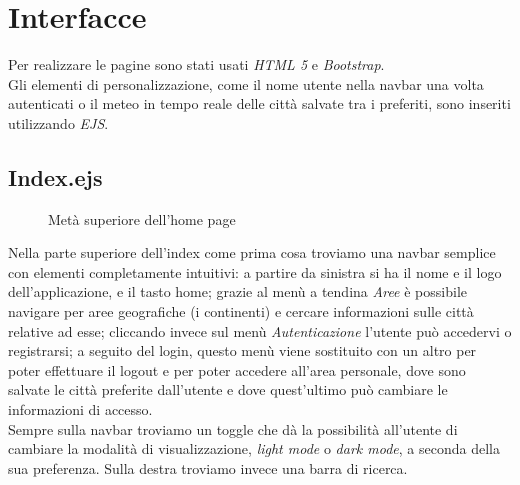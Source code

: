 \chapter{Interfacce}

Per realizzare le pagine sono stati usati \emph{HTML 5} e \emph{Bootstrap}.\\
Gli elementi di personalizzazione, come il nome utente nella navbar una volta autenticati o il meteo
in tempo reale delle città salvate tra i preferiti, sono inseriti utilizzando \emph{EJS}.

\section{Index.ejs}

\begin{figure}[ht]
    \centering
    \caption{Metà superiore dell'home page}
\end{figure}

Nella parte superiore dell'index come prima cosa troviamo una navbar semplice con elementi completamente intuitivi: a partire da sinistra si ha il nome e il logo dell'applicazione,
e il tasto home; grazie al menù a tendina \emph{Aree} è possibile navigare per aree geografiche (i continenti) e cercare informazioni sulle città relative ad esse; cliccando invece sul menù \emph{Autenticazione}
l'utente può accedervi o registrarsi; a seguito del login, questo menù viene sostituito con un altro per poter effettuare il logout e per poter accedere all'area personale, dove sono salvate le città
preferite dall'utente e dove quest'ultimo può cambiare le informazioni di accesso. \\
Sempre sulla navbar troviamo un toggle che dà la possibilità all'utente di cambiare la modalità di visualizzazione,
\emph{light mode} o \emph{dark mode}, a seconda della sua preferenza. Sulla destra troviamo invece una barra di ricerca.

